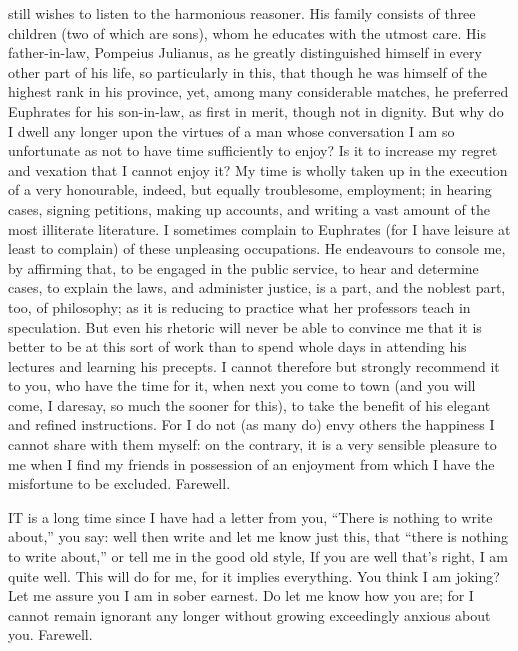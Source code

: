 still wishes to listen to the harmonious reasoner. His family consists of
three children (two of which are sons), whom he educates with the utmost
care. His father-in-law, Pompeius Julianus, as he greatly distinguished
himself in every other part of his life, so particularly in this, that
though he was himself of the highest rank in his province, yet, among many
considerable matches, he preferred Euphrates for his son-in-law, as first
in merit, though not in dignity. But why do I dwell any longer upon the
virtues of a man whose conversation I am so unfortunate as not to have
time sufficiently to enjoy? Is it to increase my regret and vexation that
I cannot enjoy it? My time is wholly taken up in the execution of a very
honourable, indeed, but equally troublesome, employment; in hearing cases,
signing petitions, making up accounts, and writing a vast amount of the
most illiterate literature. I sometimes complain to Euphrates (for I have
leisure at least to complain) of these unpleasing occupations. He
endeavours to console me, by affirming that, to be engaged in the public
service, to hear and determine cases, to explain the laws, and administer
justice, is a part, and the noblest part, too, of philosophy; as it is
reducing to practice what her professors teach in speculation. But even
his rhetoric will never be able to convince me that it is better to be at
this sort of work than to spend whole days in attending his lectures and
learning his precepts. I cannot therefore but strongly recommend it to
you, who have the time for it, when next you come to town (and you will
come, I daresay, so much the sooner for this), to take the benefit of his
elegant and refined instructions. For I do not (as many do) envy others
the happiness I cannot share with them myself: on the contrary, it is a
very sensible pleasure to me when I find my friends in possession of an
enjoyment from which I have the misfortune to be excluded. Farewell.


IT is a long time since I have had a letter from you, ``There is nothing to
write about,'' you say: well then write and let me know just this, that
``there is nothing to write about,'' or tell me in the good old style, If
you are well that's right, I am quite well. This will do for me, for it
implies everything. You think I am joking? Let me assure you I am in sober
earnest. Do let me know how you are; for I cannot remain ignorant any
longer without growing exceedingly anxious about you. Farewell.

